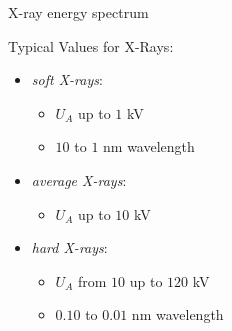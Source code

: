 



\begin{frame}[c]{X-ray energy spectrum}

    Typical Values for X-Rays:
    \vspace{0.4cm}
    \begin{itemize}
        \setlength\itemsep{0.4cm}
        \item {\em soft X-rays}:
              \begin{itemize}
                  \item  $U_A$ up to  $1$ kV
                  \item $10$ to $1$ nm wavelength
              \end{itemize}
        \item {\em average X-rays}:
              \begin{itemize} \item $U_A$ up to  $10$ kV \end{itemize}
        \item {\em hard X-rays}:
              \begin{itemize}
                  \item $U_A$ from $10$ up to $120$ kV \\
                  \item $0.10$ to $0.01$ nm wavelength
              \end{itemize}
    \end{itemize}
\end{frame}


